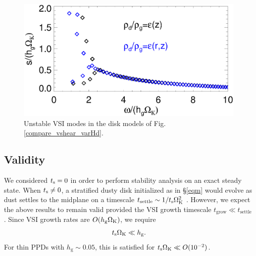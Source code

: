 \begin{figure}
  \includegraphics[width=\linewidth]{figures/compare_eigenvals_varHd} 
  \caption{Unstable VSI modes in the disk models of
    Fig. \protect\ref{compare_vshear_varHd}.  
    \label{vsi_dust_varHd}
    }
\end{figure}



\subsection{Validity}
We considered $t_\mathrm{s}=0$ in order to perform stability analysis on an
exact steady state. When $t_\mathrm{s}\neq0$, a stratified dusty 
disk initialized as in \S\ref{eqm} would evolve 
as dust settles to the
midplane on a timescale $t_\mathrm{settle}\sim 1/t_\mathrm{s}\Omega_{\rm K}^2$
\citep{takeuchi02}. However, we expect the above results to remain
valid provided the VSI growth
timescale $t_\mathrm{grow}\ll t_\mathrm{settle}$. Since 
VSI growth rates are $O(h_\mathrm{g}\Omega_{\rm K})$, we require 
\begin{align}
  t_\mathrm{s}\Omega_{\rm K} \ll h_\mathrm{g}. 
\end{align} 
For thin PPDs with $h_\mathrm{g}\sim 0.05$, this is satisfied 
for $t_\mathrm{s}\Omega_{\rm K} \ll O(10^{-2})$.  

